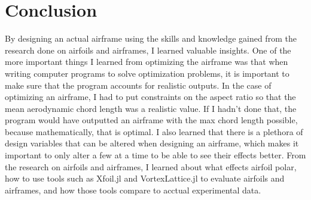 \documentclass{journal}
\begin{document}
	\section{Conclusion}
	By designing an actual airframe using the skills and knowledge gained from the research done on airfoils and airframes, I learned valuable insights. One of the more important things I learned from optimizing the airframe was that when writing computer programs to solve optimization problems, it is important to make sure that the program accounts for realistic outputs. In the case of optimizing an airframe, I had to put constraints on the aspect ratio so that the mean aerodynamic chord length was a realistic value. If I hadn't done that, the program would have outputted an airframe with the max chord length possible, because mathematically, that is optimal. I also learned that there is a plethora of design variables that can be altered when designing an airframe, which makes it important to only alter a few at a time to be able to see their effects better. From the research on airfoils and airframes, I learned about what effects airfoil polar, how to use tools such as Xfoil.jl \cite{McDonnell} and VortexLattice.jl \cite{McDonnell-Ning} to evaluate airfoils and airframes, and how those tools compare to acctual experimental data.\\
 	
 	\printbibliography
	
\end{document}
